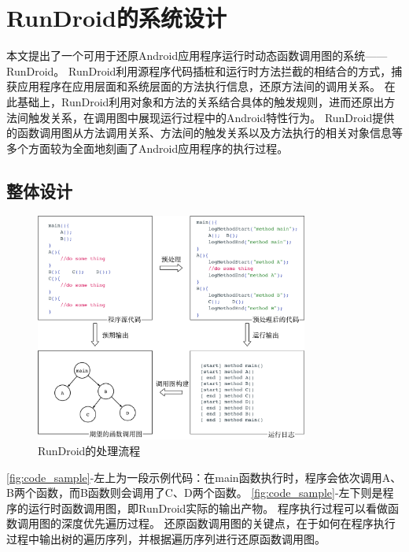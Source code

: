 \chapter{RunDroid的系统设计}
\label{chp:design}





本文提出了一个可用于还原Android应用程序运行时动态函数调用图的系统——RunDroid。
RunDroid利用源程序代码插桩和运行时方法拦截的相结合的方式，捕获应用程序在应用层面和系统层面的方法执行信息，还原方法间的调用关系。
在此基础上，RunDroid利用对象和方法的关系结合具体的触发规则，进而还原出方法间触发关系，在调用图中展现运行过程中的Android特性行为。
RunDroid提供的函数调用图从方法调用关系、方法间的触发关系以及方法执行的相关对象信息等多个方面较为全面地刻画了Android应用程序的执行过程。


\section{整体设计}



\begin{figure}[!ht]
	\centering
	\includegraphics[width=0.8\textwidth]{./Figures/code-sample.png}
	\caption{RunDroid的处理流程}
	\label{fig:code_sample}
\end{figure}


\autoref{fig:code_sample}-左上为一段示例代码：在main函数执行时，程序会依次调用A、B两个函数，而B函数则会调用了C、D两个函数。
\autoref{fig:code_sample}-左下则是程序的运行时函数调用图，即RunDroid实际的输出产物。
程序执行过程可以看做函数调用图的深度优先遍历过程。
还原函数调用图的关键点，在于如何在程序执行过程中输出树的遍历序列，并根据遍历序列进行还原函数调用图。

